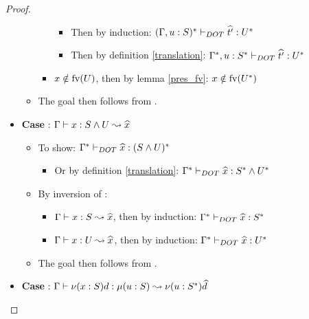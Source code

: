 \begin{proof}
\begin{itemize}
\begin{itemize}
\begin{itemize}
                \begin{itemize}
                    \item Then by induction:
                        $(\Gamma, u: S)^{*} \vdash_{DOT} \widehat{t'}: U^{*}$
                    \item Then by definition \ref{translation}:
                        $\Gamma^{*}, u: S^{*} \vdash_{DOT} \widehat{t'}: U^{*}$
                \end{itemize}
                \item $x \notin \text{fv}(U)$, then by lemma \ref{pres_fv}: $x \notin
                    \text{fv}(U^{*})$
            \end{itemize}
            \item The goal then follows from .
        \end{itemize}
        \item \textbf{Case} : $\Gamma \vdash x: S \wedge U \leadsto \widehat{x}$
        \begin{itemize}
            \item To show:
                $\Gamma^{*} \vdash_{DOT} \widehat{x}: (S \wedge U)^{*}$
            \begin{itemize}
                \item Or by definition \ref{translation}:
                    $\Gamma^{*} \vdash_{DOT} \widehat{x}: S^{*} \wedge U^{*}$
            \end{itemize}
            \item By inversion of :
            \begin{itemize}
                \item $\Gamma \vdash x: S \leadsto \widehat{x}$, then by induction:
                    $\Gamma^{*} \vdash_{DOT} \widehat{x}: S^{*}$
                \item $\Gamma \vdash x: U \leadsto \widehat{x}$, then by induction:
                    $\Gamma^{*} \vdash_{DOT} \widehat{x}: U^{*}$
            \end{itemize}
            \item The goal then follows from .
        \end{itemize}
        \item \textbf{Case} : $\Gamma \vdash \nu(x:S)d: \mu(u : S) \leadsto \nu(u:S^{*})\widehat{d}$
\end{itemize}
\end{proof}
